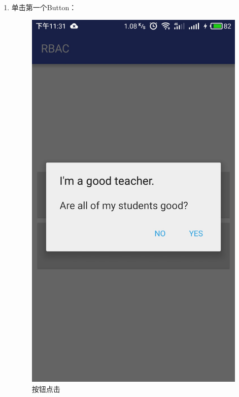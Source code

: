 \begin{itemize}
\begin{enumerate}
\begin{itemize}
\begin{enumerate}
				\item 单击第一个Button：
				\begin{figure}[H]
					\centering
					\includegraphics[height=0.39\textheight]{snapshot/6}
					\caption{按钮点击}
					\label{fig:6}
				\end{figure}
				

\end{enumerate}
\end{itemize}
\end{enumerate}
\end{itemize}
